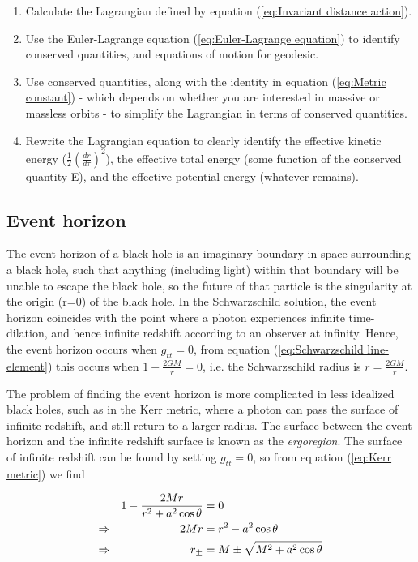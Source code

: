 \begin{enumerate}
    \item Calculate the Lagrangian defined by equation (\ref{eq:Invariant distance action}).
    \item Use the Euler-Lagrange equation (\ref{eq:Euler-Lagrange equation}) to identify conserved quantities, and equations of motion for geodesic.
    \item Use conserved quantities, along with the identity in equation (\ref{eq:Metric constant}) - which depends on whether you are interested in massive or massless orbits - to simplify the Lagrangian in terms of conserved quantities.
    \item Rewrite the Lagrangian equation to clearly identify the effective kinetic energy ($\frac{1}{2} \left( \frac{dr}{d\tau} \right)^2$), the effective total energy (some function of the conserved quantity E), and the effective potential energy (whatever remains).
\end{enumerate}  

\subsection{Event horizon}\label{sec:Event horizons}

The event horizon of a black hole is an imaginary boundary in space surrounding a black hole, such that anything (including light) within that boundary will be unable to escape the black hole, so the future of that particle is the singularity at the origin (r=0) of the black hole. In the Schwarzschild solution, the event horizon coincides with the point where a photon experiences infinite time-dilation, and hence infinite redshift according to an observer at infinity. Hence, the event horizon occurs when $g_{tt}=0$, from equation (\ref{eq:Schwarzschild line-element}) this occurs when $1-\frac{2GM}{r}=0$, i.e. the Schwarzschild radius is $r=\frac{2GM}{r}$.

The problem of finding the event horizon is more complicated in less idealized black holes, such as in the Kerr metric, where a photon can pass the surface of infinite redshift, and still return to a larger radius. The surface between the event horizon and the infinite redshift surface is known as the \textit{ergoregion}. The surface of infinite redshift can be found by setting $g_{tt}=0$, so from equation (\ref{eq:Kerr metric}) we find 

\begin{alignat}{2}
    &&1-\frac{2 M r}{r^2+a^2 \cos{\theta}} &= 0 \notag \\
    \Rightarrow
    && 2 M r &= r^2 - a^2 \cos{\theta} \notag \\
    \Rightarrow
    &&r_{\pm} &= M \pm \sqrt{M^2+a^2 \cos{\theta}}\label{eq:Kerr infinite redshift radius}
\end{alignat}

